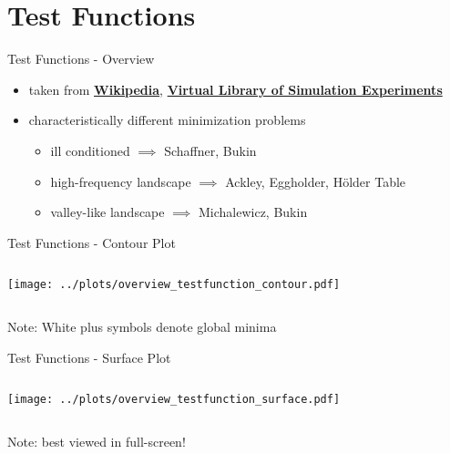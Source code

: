 \documentclass[11pt,aspectratio=169]{beamer}
\begin{document}
%
%

\section{Test Functions}

%
%

\begin{frame}[fragile]{Test Functions - Overview}
    \begin{itemize}
        \item taken from \href{https://en.wikipedia.org/wiki/Test_functions_for_optimization}{\textbf{Wikipedia}}, 
            \href{https://www.sfu.ca/~ssurjano/michal.html}{\textbf{Virtual Library of Simulation Experiments}}
        \item characteristically different minimization problems
            \begin{itemize}
                \item ill conditioned $\implies$ Schaffner, Bukin
                \item high-frequency landscape $\implies$ Ackley, Eggholder, H\"older Table
                \item valley-like landscape $\implies$ Michalewicz, Bukin
            \end{itemize}

    \end{itemize}
\end{frame}

%
%

\begin{frame}[fragile]{Test Functions - Contour Plot}

    \begin{columns}
    \begin{column}{0.8\textwidth}
        \texttt{[image: ../plots/overview\_testfunction\_contour.pdf]}
    \end{column}
    \end{columns}
    \tiny{Note: White plus symbols denote global minima}

\end{frame}

%
%

\begin{frame}[fragile]{Test Functions - Surface Plot}

    \begin{columns}
    \begin{column}{0.8\textwidth}
        \texttt{[image: ../plots/overview\_testfunction\_surface.pdf]}
    \end{column}
    \end{columns}

    \tiny{Note: best viewed in full-screen!}

\end{frame}
\end{document}
